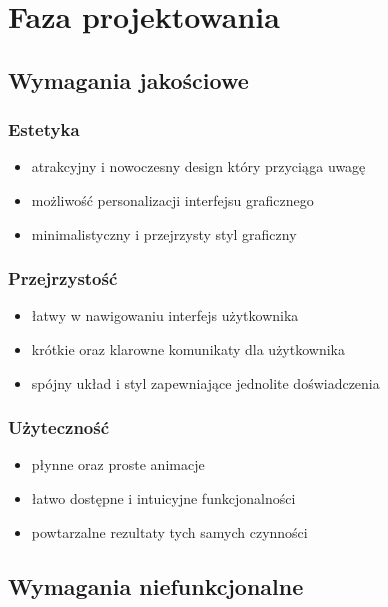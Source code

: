 \section{Faza projektowania}

\subsection{Wymagania jakościowe}

\subsubsection{Estetyka}

\begin{itemize}[leftmargin=*]
    \item atrakcyjny i nowoczesny design który przyciąga uwagę
    \item możliwość personalizacji interfejsu graficznego
    \item minimalistyczny i przejrzysty styl graficzny
\end{itemize}

\subsubsection{Przejrzystość}

\begin{itemize}[leftmargin=*]
    \item łatwy w nawigowaniu interfejs użytkownika
    \item krótkie oraz klarowne komunikaty dla użytkownika
    \item spójny układ i styl zapewniające jednolite doświadczenia
\end{itemize}

\subsubsection{Użyteczność}

\begin{itemize}[leftmargin=*]
    \item płynne oraz proste animacje
    \item łatwo dostępne i intuicyjne funkcjonalności
    \item powtarzalne rezultaty tych samych czynności
\end{itemize}

\newpage

\subsection{Wymagania niefunkcjonalne}

